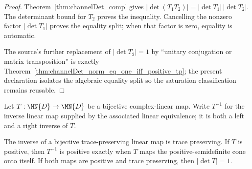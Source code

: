 \begin{proof}\leanok
    Theorem~\ref{thm:channelDet_comp} gives
    $|\det(T_1T_2)|=|\det T_1|\,|\det T_2|$.  The determinant bound for
    $T_2$ proves the inequality.  Cancelling the nonzero factor
    $|\det T_1|$ proves the equality split; when that factor is zero,
    equality is automatic.

    The source's further replacement of $|\det T_2|=1$ by ``unitary
    conjugation or matrix transposition'' is exactly
    Theorem~\ref{thm:channelDet_norm_eq_one_iff_positive_tp}; the present
    declaration isolates the algebraic equality split so the saturation
    classification remains reusable.
\end{proof}

\begin{definition}
    \label{def:inverse_of_bijective_matrix_endomorphism}
    \leanok
    Let $T:\MN{D}\to\MN{D}$ be a bijective complex-linear map.  Write
    $T^{-1}$ for the inverse linear map supplied by the associated linear
    equivalence; it is both a left and a right inverse of $T$.
\end{definition}

\begin{theorem}
    \label{thm:positive_inverse_preliminaries}
    \leanok
    The inverse of a bijective trace-preserving linear map is trace preserving.
    If $T$ is positive, then $T^{-1}$ is positive exactly when $T$ maps the
    positive-semidefinite cone onto itself.  If both maps are positive and
    trace preserving, then $|\det T|=1$.
\end{theorem}


